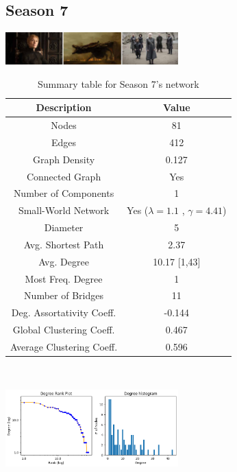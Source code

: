 \documentclass[10pt,twocolumn,letterpaper]{article}
\begin{document}
\subsection{Season 7}


\begin{center}
    \includegraphics[width=0.5\textwidth]{img/s7/s7_frames.jpg}
\end{center}


\begin{table}[!h]
    \centering
    \small
    \begin{tabular}{c|c}
        Description & Value  \\
        \hline
        Nodes & 81\\
        Edges & 412 \\
        Graph Density & 0.127 \\
        Connected Graph & Yes \\
        Number of Components & 1 \\
        Small-World Network & Yes ($\lambda=1.1$ , $\gamma=4.41$) \\
        Diameter & 5 \\
        Avg. Shortest Path & 2.37 \\
        Avg. Degree & 10.17 [1,43] \\
        Most Freq. Degree & 1 \\
        Number of Bridges & 11 \\
        Deg. Assortativity Coeff. & -0.144\\
        Global Clustering Coeff. & 0.467 \\
        Average Clustering Coeff. & 0.596 \\
        \hline 
    \end{tabular}
    \vspace{0.2cm}
    \caption{Summary table for Season 7's network}
    \label{tab:my_label}
\end{table} \\

\begin{center}
    \includegraphics[width=0.5\textwidth]{img/s7/degree_plot.jpg}
\end{center}
\end{document}
